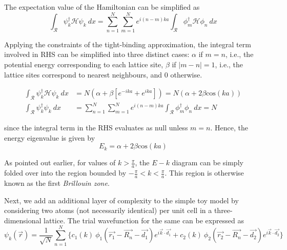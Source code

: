 The expectation value of the Hamiltonian can be simplified as
\begin{equation*}
    \int_{\mathcal{R}} \psi_{k}^{\dagger}\mathcal{H}\psi_{k} \: dx = \sum_{n=1}^{N} \sum_{m=1}^{N}e^{i(n-m)ka} \int_{\mathcal{R}} \phi_{m}^{\dagger}\mathcal{H}\phi_{n} \: dx
\end{equation*}

Applying the constraints of the tight-binding approximation, the integral term involved in RHS can be simplified into three distinct cases: $\alpha$ if $m = n$, i.e., the potential energy corresponding to each lattice site, $\beta$ if $|m-n| =1$, i.e., the lattice sites correspond to nearest neighbours, and $0$ otherwise.

\begin{equation*}
   \begin{aligned}
   	  \int_{\mathcal{R}} \psi_{k}^{\dagger}\mathcal{H}\psi_{k} \: dx &= N(\alpha + \beta[e^{-ika}+e^{ika}]) = N(\alpha + 2\beta \text{cos}(ka)) \\
   	  \int_{\mathcal{R}} \psi_{k}^{\dagger}\psi_{k} \: dx &= \sum_{n=1}^{N} \sum_{m=1}^{N}e^{i(n-m)ka} \int_{\mathcal{R}} \phi_{m}^{\dagger}\phi_{n}\: dx = N
   \end{aligned}
\end{equation*}

since the integral term in the RHS evaluates as null unless $m = n$. Hence, the energy eigenvalue is given by
\begin{equation}
    E_{k} = \alpha + 2\beta \text{cos}(ka)
\end{equation}

As pointed out earlier, for values of $k > \frac{\pi}{a}$, the $E-k$ diagram can be simply folded over into the region bounded by $-\frac{\pi}{a} < k < \frac{\pi}{a}$. This region is otherwise known as the first \textit{Brillouin zone}. \\

\newpage

Next, we add an additional layer of complexity to the simple toy model by considering two atoms (not necessarily identical) per unit cell in a three-dimensional lattice. The trial wavefunction for the same can be expressed as
\begin{equation*} 
    \psi_{k}(\vec{r}) = \frac{1}{\sqrt{N}}\sum_{n=1}^{N}\{c_{1}(k) \: \phi_{1}(\vec{r_{1}}-\vec{R_{n}}-\vec{d_{1}})e^{i\vec{k}\cdot \vec{d_{1}}} + c_{2}(k)\: \phi_{2}(\vec{r_{2}}-\vec{R_{n}}-\vec{d_{2}})e^{i\vec{k}\cdot \vec{d_{2}}}\}
\end{equation*}

